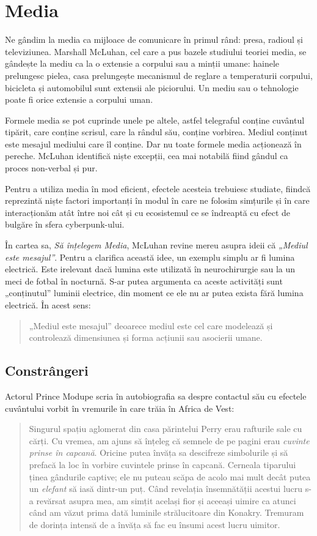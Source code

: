 \chapter {Media}

Ne gândim la media ca mijloace de comunicare în primul rând: presa, radioul și televiziunea.
Marshall McLuhan, cel care a pus bazele studiului teoriei media, se gândește la mediu ca la o extensie a corpului sau a minții umane: hainele prelungesc pielea, casa prelungește mecanismul de reglare a temperaturii corpului, bicicleta și automobilul sunt extensii ale piciorului. Un mediu sau o tehnologie poate fi orice extensie a corpului uman.

Formele media se pot cuprinde unele pe altele, astfel telegraful conține cuvântul tipărit, care conține scrisul, care la rândul său, conține vorbirea. Mediul conținut este mesajul mediului care îl conține. Dar nu toate formele media acționează în pereche. McLuhan identifică niște excepții, cea mai notabilă fiind gândul ca proces non-verbal și pur.

Pentru a utiliza media în mod eficient, efectele acesteia trebuiesc studiate, fiindcă reprezintă niște factori importanți în modul în care ne folosim simțurile și în care interacționăm atât între noi cât și cu ecosistemul ce se îndreaptă cu efect de bulgăre în sfera cyberpunk-ului.

În cartea sa, \textit{Să înțelegem Media}, McLuhan revine mereu asupra ideii că \textit{„Mediul este mesajul”}.
Pentru a clarifica această idee, un exemplu simplu ar fi lumina electrică. Este irelevant dacă lumina este utilizată în neurochirurgie sau la un meci de fotbal în nocturnă. S-ar putea argumenta ca aceste activități sunt „conținutul” luminii electrice, din moment ce ele nu ar putea exista fără lumina electrică.
În acest sens: \begin{quotation}
„Mediul este mesajul” deoarece mediul este cel care modelează și controlează dimensiunea și forma acțiunii sau asocierii umane.
\end{quotation}

\section{Constrângeri}

Actorul Prince Modupe scria în autobiografia sa despre contactul său cu efectele cuvântului vorbit în vremurile în care trăia în Africa de Vest:
\begin{quote}
Singurul spațiu aglomerat din casa părintelui Perry erau rafturile sale cu cărți. Cu vremea, am ajuns să înțeleg că semnele de pe pagini erau \textit{cuvinte prinse în capcană}. Oricine putea învăța sa descifreze simbolurile și să prefacă la loc în vorbire cuvintele prinse în capcană. Cerneala tiparului ținea gândurile captive; ele nu puteau scăpa de acolo mai mult decât putea un \textit{elefant} să iasă dintr-un puț. Când revelația însemnătății acestui lucru s-a revărsat asupra mea, am simțit același fior și aceeași uimire ca atunci când am văzut prima dată luminile strălucitoare din Konakry. Tremuram de dorința intensă de a învăța să fac eu însumi acest lucru uimitor.
\end{quote}

